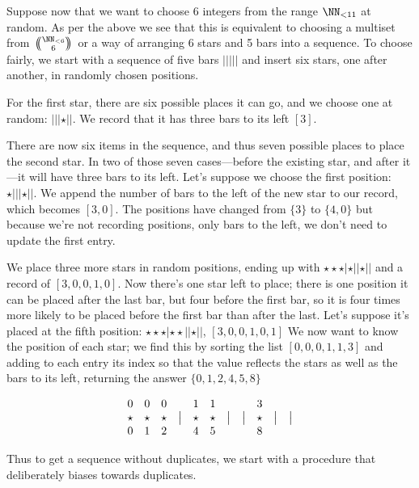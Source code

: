 \documentclass[letterpaper,luatex,11pt]{article}
\newcommand{\multichoose}[2]{
\left.\mathchoice
  {\left(\kern-0.48em\binom{#1}{#2}\kern-0.48em\right)}
  {\big(\kern-0.30em\binom{\smash{#1}}{\smash{#2}}\kern-0.30em\big)}
  {\left(\kern-0.30em\binom{\smash{#1}}{\smash{#2}}\kern-0.30em\right)}
  {\left(\kern-0.30em\binom{\smash{#1}}{\smash{#2}}\kern-0.30em\right)}
\right.}
\begin{document}
Suppose now that we want to choose 6 integers from the range $\NN_{<11}$ 
at random. As per the above we see that this 
is equivalent to choosing a multiset from \(\multichoose{\NN_{<6}}{6}\)
or a way of arranging 6 stars and 5 bars into a sequence.
To choose fairly, we start with a sequence of five bars \(|||||\) and insert six stars,
one after another, in randomly chosen positions.

For the first star, there are six possible places it can go, and we choose one at random:
\(|||\star||\). We record that it has three bars to its left \([3]\).

There are now six items in the sequence, and thus seven possible places to place the second star.
In two of those seven cases---before the existing star, and after it---it will have three bars
to its left. Let's suppose we choose the first position: \(\star|||\star||\). We append
the number of bars to the left of the new star to our record, which becomes \([3, 0]\).
The positions have changed from \(\{3\}\)
to \(\{4, 0\}\) but because we're not recording positions, only bars to the left, we don't need to
update the first entry.

We place three more stars in random positions, ending up with \(\star\star\star|\star||\star||\)
and a record of \([3, 0, 0, 1, 0]\). Now there's one star left to place; there is one
position it can be placed after the last bar, but four before the first bar, so it is four times
more likely to be placed before the first bar than after the last. Let's suppose it's placed
at the fifth position: \(\star\star\star|\star\star||\star||\), \([3, 0, 0, 1, 0, 1]\) We now
want to know the position of each star; we find this by sorting the list \([0, 0, 0, 1, 1, 3]\)
and adding to each entry its index so that the value reflects the stars as well as the bars to its
left, returning the answer $\{0, 1, 2, 4, 5, 8\}$

\begin{displaymath}
\begin{array}{ c c c c c c c c c c c }
    0 & 0 & 0 & & 1 & 1 & & & 3 & & \\
    \star & \star & \star & \big| & \star & \star & \big| & \big| & \star & \big| & \big| \\
    0 & 1 & 2 & & 4 & 5 & & & 8 & & \\
\end{array}
\end{displaymath}

Thus to get a sequence without duplicates, we start with a procedure that deliberately
biases towards duplicates.
\end{document}
